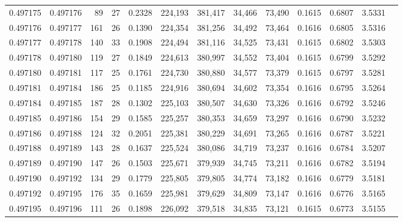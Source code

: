 \begin{tabular}{rrrrrrrrrrrrr}
0.497175 & 0.497176 &  89 &  27 &                                     0.2328 & 224,193 & 381,417 &  34,466 &  73,490 & 0.1615 & 0.6807 & 3.5331 \\
0.497176 & 0.497177 & 161 &  26 &                                     0.1390 & 224,354 & 381,256 &  34,492 &  73,464 & 0.1616 & 0.6805 & 3.5316 \\
0.497177 & 0.497178 & 140 &  33 &                                     0.1908 & 224,494 & 381,116 &  34,525 &  73,431 & 0.1615 & 0.6802 & 3.5303 \\
0.497178 & 0.497180 & 119 &  27 &                                     0.1849 & 224,613 & 380,997 &  34,552 &  73,404 & 0.1615 & 0.6799 & 3.5292 \\
0.497180 & 0.497181 & 117 &  25 &                                     0.1761 & 224,730 & 380,880 &  34,577 &  73,379 & 0.1615 & 0.6797 & 3.5281 \\
0.497181 & 0.497184 & 186 &  25 &                                     0.1185 & 224,916 & 380,694 &  34,602 &  73,354 & 0.1616 & 0.6795 & 3.5264 \\
0.497184 & 0.497185 & 187 &  28 &                                     0.1302 & 225,103 & 380,507 &  34,630 &  73,326 & 0.1616 & 0.6792 & 3.5246 \\
0.497185 & 0.497186 & 154 &  29 &                                     0.1585 & 225,257 & 380,353 &  34,659 &  73,297 & 0.1616 & 0.6790 & 3.5232 \\
0.497186 & 0.497188 & 124 &  32 &                                     0.2051 & 225,381 & 380,229 &  34,691 &  73,265 & 0.1616 & 0.6787 & 3.5221 \\
0.497188 & 0.497189 & 143 &  28 &                                     0.1637 & 225,524 & 380,086 &  34,719 &  73,237 & 0.1616 & 0.6784 & 3.5207 \\
0.497189 & 0.497190 & 147 &  26 &                                     0.1503 & 225,671 & 379,939 &  34,745 &  73,211 & 0.1616 & 0.6782 & 3.5194 \\
0.497190 & 0.497192 & 134 &  29 &                                     0.1779 & 225,805 & 379,805 &  34,774 &  73,182 & 0.1616 & 0.6779 & 3.5181 \\
0.497192 & 0.497195 & 176 &  35 &                                     0.1659 & 225,981 & 379,629 &  34,809 &  73,147 & 0.1616 & 0.6776 & 3.5165 \\
0.497195 & 0.497196 & 111 &  26 &                                     0.1898 & 226,092 & 379,518 &  34,835 &  73,121 & 0.1615 & 0.6773 & 3.5155 \\

\end{tabular}

